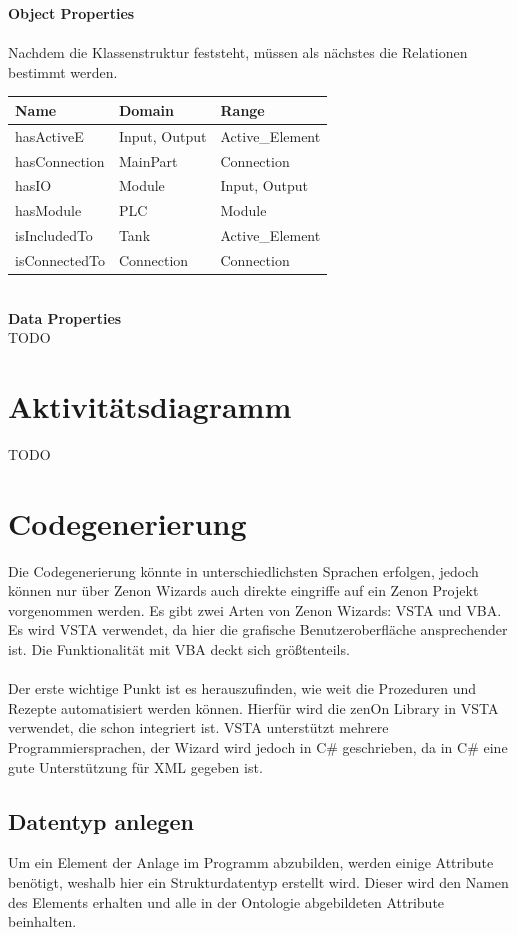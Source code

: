\textbf{Object Properties}\\
\\
Nachdem die Klassenstruktur feststeht, müssen als nächstes die Relationen bestimmt werden.
\begin{table}[h]
\centering
\begin{tabular}{l|l|l}
\textbf{Name} & \textbf{Domain} & \textbf{Range} \\ \hline
hasActiveE    & Input, Output   & Active\_Element \\ \hline
hasConnection & MainPart        & Connection      \\ \hline
hasIO         & Module          & Input, Output   \\ \hline
hasModule     & PLC             & Module          \\ \hline
isIncludedTo  & Tank            & Active\_Element \\ \hline
isConnectedTo & Connection      & Connection                            
\end{tabular}
\end{table}
\\
\textbf{Data Properties}\\
TODO
\section{Aktivitätsdiagramm}
TODO
\section{Codegenerierung}

Die Codegenerierung könnte in unterschiedlichsten Sprachen erfolgen, jedoch können nur über Zenon Wizards auch direkte eingriffe auf ein Zenon Projekt vorgenommen werden. Es gibt zwei Arten von Zenon Wizards: VSTA und VBA. Es wird VSTA verwendet, da hier die grafische Benutzeroberfläche ansprechender ist. Die Funktionalität mit VBA deckt sich größtenteils.\\\\
Der erste wichtige Punkt ist es herauszufinden, wie weit die Prozeduren und Rezepte automatisiert werden können. Hierfür wird  die zenOn Library in VSTA verwendet, die schon integriert ist. VSTA unterstützt mehrere Programmiersprachen, der Wizard wird jedoch in C\# geschrieben, da in C\# eine gute Unterstützung für XML gegeben ist.\\

\subsection{Datentyp anlegen}
Um ein Element der Anlage im Programm abzubilden, werden einige Attribute benötigt, weshalb hier ein Strukturdatentyp erstellt wird. Dieser wird den Namen des Elements erhalten und alle in der Ontologie abgebildeten Attribute beinhalten.

